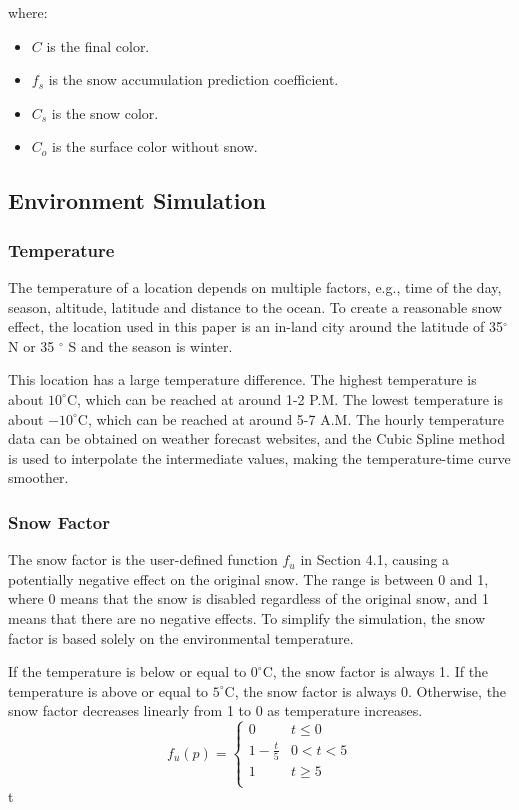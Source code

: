 \documentclass{article}
\begin{document}
where:
\begin{itemize}
  \item \( C \) is the final color.
  \item \( f_{s} \) is the snow accumulation prediction coefficient.
  \item \( C_{s} \) is the snow color.
  \item \( C_{o} \) is the surface color without snow.
\end{itemize}

\subsection {Environment Simulation}

\subsubsection {Temperature}
The temperature of a location depends on multiple factors, e.g., time of the day, season, altitude, latitude and distance to the ocean. 
To create a reasonable snow effect, the location used in this paper is an in-land city around the latitude of 35$^{\circ}$ N or 35
$^{\circ}$ S and the season is winter.

This location has a large temperature difference. The highest temperature is about \(10^\circ\mathrm{C}\), which can be reached at 
around 1-2 P.M. The lowest temperature is about \(-10^\circ\mathrm{C}\), which can be reached at around 5-7 A.M. The hourly 
temperature data can be obtained on weather forecast websites, and the Cubic Spline method is used to interpolate the intermediate 
values, making the temperature-time curve smoother.

\subsubsection {Snow Factor}
The snow factor is the user-defined function \( f_{u} \) in Section 4.1, causing a potentially negative effect on the original snow. 
The range is between 0 and 1, where 0 means that the snow is disabled regardless of the original snow, and 1 means that there are no 
negative effects. To simplify the simulation, the snow factor is based solely on the environmental temperature. 

If the temperature is below or equal to \(0^\circ\mathrm{C}\), the snow factor is always 1. If the temperature is above or equal to 
\(5^\circ\mathrm{C}\), the snow factor is always 0. Otherwise, the snow factor decreases linearly from 1 to 0 as temperature increases.
\[
  f_{u}(p)=
  \left\{
    \begin{array}{ll}
      0 & t\leq 0 \\
      1 - \frac{t}{5} &  0 < t < 5 \\
      1 & t\geq 5 \\
    \end{array} 
  \right. 
\]
 t 
\end{document}
